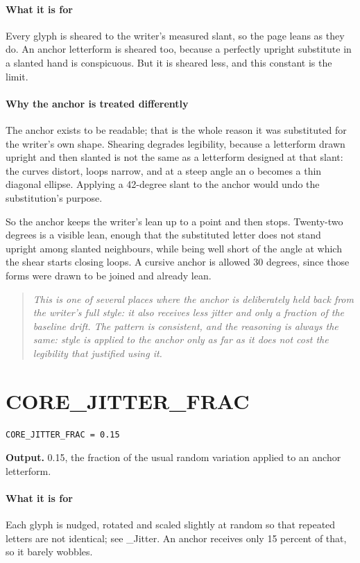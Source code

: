 \paragraph{What it is for}
Every glyph is sheared to the writer's measured slant, so the page leans as they do. An anchor letterform is sheared too, because a perfectly upright substitute in a slanted hand is conspicuous. But it is sheared less, and this constant is the limit.


\paragraph{Why the anchor is treated differently}
The anchor exists to be readable; that is the whole reason it was substituted for the writer's own shape. Shearing degrades legibility, because a letterform drawn upright and then slanted is not the same as a letterform designed at that slant: the curves distort, loops narrow, and at a steep angle an o becomes a thin diagonal ellipse. Applying a 42-degree slant to the anchor would undo the substitution's purpose.

So the anchor keeps the writer's lean up to a point and then stops. Twenty-two degrees is a visible lean, enough that the substituted letter does not stand upright among slanted neighbours, while being well short of the angle at which the shear starts closing loops. A cursive anchor is allowed 30 degrees, since those forms were drawn to be joined and already lean.


\begin{quote}\small\itshape This is one of several places where the anchor is deliberately held back from the writer's full style: it also receives less jitter and only a fraction of the baseline drift. The pattern is consistent, and the reasoning is always the same: style is applied to the anchor only as far as it does not cost the legibility that justified using it.\end{quote}

\section{CORE\_JITTER\_FRAC}
\begin{lstlisting}[style=sig]
CORE_JITTER_FRAC = 0.15
\end{lstlisting}

\noindent\textbf{Output.} 0.15, the fraction of the usual random variation applied to an anchor letterform.


\paragraph{What it is for}
Each glyph is nudged, rotated and scaled slightly at random so that repeated letters are not identical; see \_Jitter. An anchor receives only 15 percent of that, so it barely wobbles.


